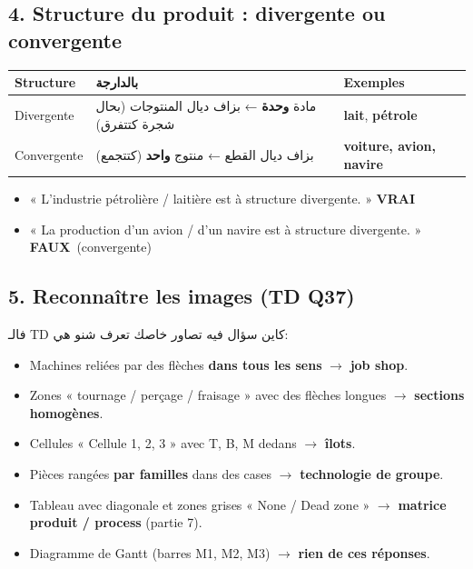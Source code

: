 \documentclass[11pt,a4paper]{article}
\newcommand{\ar}[1]{\textarabic{#1}}
\newcommand{\fr}[1]{\textfrench{#1}}
\newcommand{\vrai}{\textcolor{vert}{\textbf{VRAI}}}
\newcommand{\faux}{\textcolor{rouge}{\textbf{FAUX}}}
\begin{document}
\subsection*{4. Structure du produit : divergente ou convergente}
\begin{center}
\begin{tabularx}{\linewidth}{l >{\raggedleft\arraybackslash}X l}
\toprule
\textbf{Structure} & \ar{\textbf{بالدارجة}} & \textbf{Exemples} \\
\midrule
Divergente & \ar{مادة \textbf{وحدة} ← بزاف ديال المنتوجات (بحال شجرة كتتفرق)} & \textbf{lait}, \textbf{pétrole} \\
Convergente & \ar{بزاف ديال القطع ← منتوج \textbf{واحد} (كتتجمع)} & \textbf{voiture, avion, navire} \\
\bottomrule
\end{tabularx}
\end{center}
\begin{piege}
\begin{itemize}
\item « L'industrie pétrolière / laitière est à structure divergente. » \vrai
\item « La production d'un avion / d'un navire est à structure divergente. » \faux \ (convergente)
\end{itemize}
\end{piege}

\subsection*{5. Reconnaître les images (TD Q37)}
\par\begin{Arabic}
فالـ \fr{TD} كاين سؤال فيه تصاور خاصك تعرف شنو هي:
\end{Arabic}
\begin{itemize}
\item Machines reliées par des flèches \textbf{dans tous les sens} $\rightarrow$ \textbf{job shop}.
\item Zones « tournage / perçage / fraisage » avec des flèches longues $\rightarrow$ \textbf{sections homogènes}.
\item Cellules « Cellule 1, 2, 3 » avec T, B, M dedans $\rightarrow$ \textbf{îlots}.
\item Pièces rangées \textbf{par familles} dans des cases $\rightarrow$ \textbf{technologie de groupe}.
\item Tableau avec diagonale et zones grises « None / Dead zone » $\rightarrow$ \textbf{matrice produit / process} (partie 7).
\item Diagramme de Gantt (barres M1, M2, M3) $\rightarrow$ \textbf{rien de ces réponses}.
\end{itemize}
\end{document}
